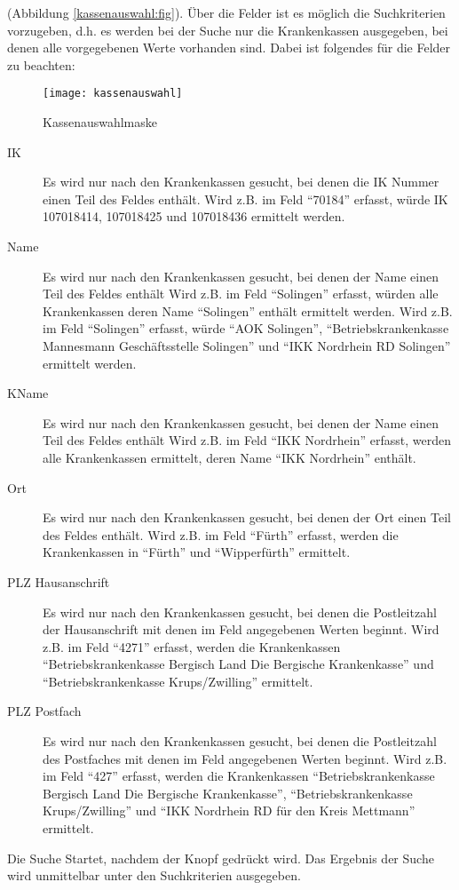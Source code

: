 (Abbildung \vref{kassenauswahl:fig}). Über die Felder  ist es möglich die
Suchkriterien vorzugeben, d.h. es werden bei der Suche nur die Krankenkassen
ausgegeben, bei denen alle vorgegebenen Werte vorhanden sind. Dabei ist
folgendes für die Felder zu beachten:

\begin{figure}[h]
\centering
\texttt{[image: kassenauswahl]}
\caption{Kassenauswahlmaske\label{kassenauswahl:fig}}
\end{figure}

\begin{description}
\item[IK] Es wird nur nach den Krankenkassen gesucht, bei denen die IK Nummer 
einen Teil des Feldes enthält.
Wird z.B. im Feld  ``70184'' erfasst,
würde IK 107018414, 107018425 und 107018436 ermittelt werden.
\item[Name] Es wird nur nach den Krankenkassen gesucht, bei denen der
Name einen Teil des Feldes enthält
Wird z.B. im Feld  ``Solingen'' erfasst,
würden alle Krankenkassen deren Name ``Solingen'' enthält ermittelt werden.
Wird z.B. im Feld  ``Solingen'' erfasst, würde
``AOK Solingen'', ``Betriebskrankenkasse Mannesmann Geschäftsstelle Solingen''
und ``IKK Nordrhein RD Solingen'' ermittelt werden.
\item[KName]
Es wird nur nach den Krankenkassen gesucht, bei denen der
Name einen Teil des Feldes enthält
Wird z.B. im Feld  ``IKK Nordrhein'' erfasst,
werden alle Krankenkassen ermittelt, deren Name ``IKK Nordrhein'' enthält.
\item[Ort] 
Es wird nur nach den Krankenkassen gesucht, bei denen der Ort einen Teil
des Feldes enthält.
Wird z.B. im Feld  ``Fürth'' erfasst, werden
die Krankenkassen in ``Fürth'' und ``Wipperfürth'' ermittelt.
\item[PLZ Hausanschrift] 
Es wird nur nach den Krankenkassen gesucht, bei denen die Postleitzahl der
Hausanschrift mit denen im Feld angegebenen Werten beginnt.
Wird z.B. im Feld  ``4271'' erfasst, werden die
Krankenkassen ``Betriebskrankenkasse Bergisch Land Die Bergische Krankenkasse'' und ``Betriebskrankenkasse Krups/Zwilling'' ermittelt.
\item[PLZ Postfach] 
Es wird nur nach den Krankenkassen gesucht, bei denen die Postleitzahl des
Postfaches mit denen im Feld angegebenen Werten beginnt.
Wird z.B. im Feld  ``427'' erfasst, werden die
Krankenkassen ``Betriebskrankenkasse Bergisch Land Die Bergische Krankenkasse'', ``Betriebskrankenkasse Krups/Zwilling'' und 
``IKK Nordrhein RD für den Kreis Mettmann'' ermittelt.
\end{description}
Die Suche Startet, nachdem der Knopf  gedrückt wird.
Das Ergebnis der Suche wird unmittelbar unter den Suchkriterien ausgegeben.

